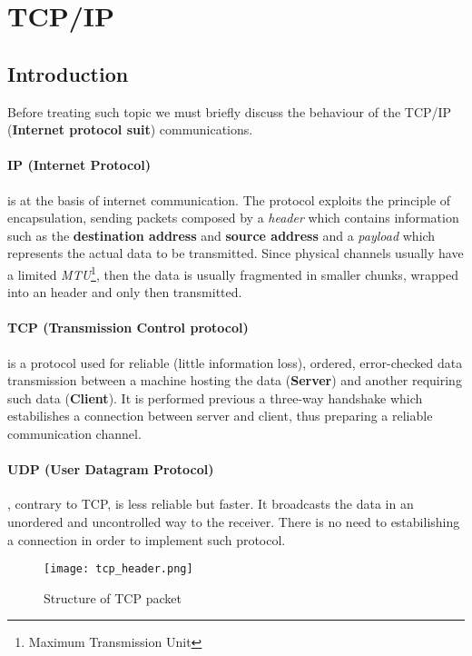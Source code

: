 \documentclass[../../main.tex]{subfiles}
\begin{document}
    

\section{TCP/IP}
\subsection{Introduction}
Before treating such topic we must briefly discuss the behaviour of the
TCP/IP (\textbf{Internet protocol suit}) communications.

\paragraph{IP (Internet Protocol)} is at the basis of internet
communication. The protocol exploits the principle of encapsulation, sending
packets composed by a \emph{header} which contains information such as the
\textbf{destination address} and \textbf{source address} and a
\emph{payload} which represents the actual data to be transmitted.
Since physical channels usually have a limited \emph{MTU}\footnote{Maximum
Transmission Unit}, then the data is usually fragmented in smaller chunks,
wrapped into an header and only then transmitted.

\paragraph{TCP (Transmission Control protocol)} is a protocol used for
reliable (little information loss), ordered, error-checked data transmission
between a machine hosting the data (\textbf{Server}) and another requiring
such data (\textbf{Client}). It is performed previous a three-way handshake
which estabilishes a connection between server and client, thus preparing a
reliable communication channel.

\paragraph{UDP (User Datagram Protocol)}, contrary to TCP, is less reliable
but faster.
It broadcasts the data in an unordered and uncontrolled way to the receiver. 
There is no need to estabilishing a connection in order to implement such
protocol.

\begin{figure}[h]
    \centering
    \caption{Structure of TCP packet}
    \texttt{[image: tcp\_header.png]}
\end{figure}
\end{document}
